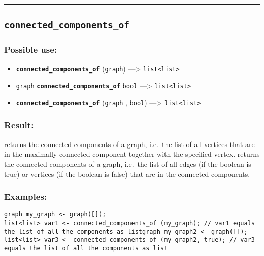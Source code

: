 \documentclass[]{book}
\providecommand{\tightlist}{%
  \setlength{\itemsep}{0pt}\setlength{\parskip}{0pt}}
\theoremstyle{definition}
\theoremstyle{definition}
\theoremstyle{definition}
\theoremstyle{remark}
\begin{document}
\begin{center}\rule{0.5\linewidth}{\linethickness}\end{center}

\subsection{\texorpdfstring{\texttt{connected\_components\_of}}{connected\_components\_of}}\label{connected_components_of}

\subsubsection{Possible use:}\label{possible-use-96}

\begin{itemize}
\tightlist
\item
  \textbf{\texttt{connected\_components\_of}} (\texttt{graph})
  ---\textgreater{} \texttt{list\textless{}list\textgreater{}}
\item
  \texttt{graph} \textbf{\texttt{connected\_components\_of}}
  \texttt{bool} ---\textgreater{}
  \texttt{list\textless{}list\textgreater{}}
\item
  \textbf{\texttt{connected\_components\_of}} (\texttt{graph} ,
  \texttt{bool}) ---\textgreater{}
  \texttt{list\textless{}list\textgreater{}}
\end{itemize}

\subsubsection{Result:}\label{result-94}

returns the connected components of a graph, i.e.~the list of all
vertices that are in the maximally connected component together with the
specified vertex. returns the connected components of a graph, i.e.~the
list of all edges (if the boolean is true) or vertices (if the boolean
is false) that are in the connected components.

\subsubsection{Examples:}\label{examples-74}

\begin{verbatim}
graph my_graph <- graph([]);  
list<list> var1 <- connected_components_of (my_graph); // var1 equals the list of all the components as listgraph my_graph2 <- graph([]);  
list<list> var3 <- connected_components_of (my_graph2, true); // var3 equals the list of all the components as list
\end{verbatim}
\end{document}
